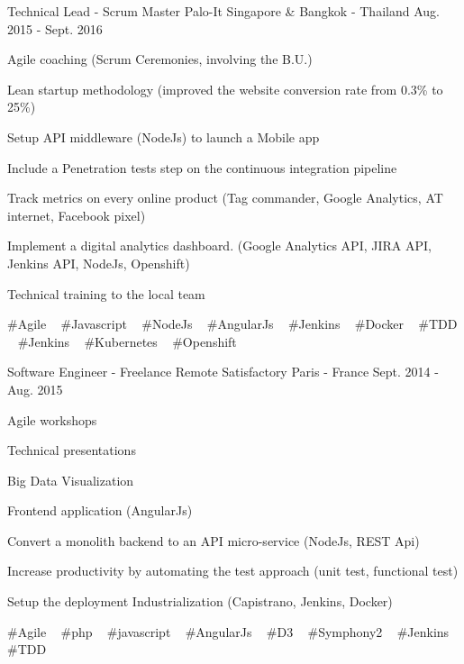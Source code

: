 \begin{cventries}
  \cventry
    {Technical Lead - Scrum Master} %
    {Palo-It} %
    {Singapore \& Bangkok - Thailand} %
    {Aug. 2015 - Sept. 2016} %
    {
      \begin{cvitems} %
        \item {Agile coaching (Scrum Ceremonies, involving the B.U.)}
        \item {Lean startup methodology (improved the website conversion rate from 0.3\% to 25\%) }
        \item {Setup API middleware (NodeJs) to launch a Mobile app}
        \item {Include a Penetration tests step on the continuous integration pipeline}
        \item {Track metrics on every online product (Tag commander, Google Analytics, AT internet, Facebook pixel)}
        \item {Implement a digital analytics dashboard. (Google Analytics API, JIRA API, Jenkins API, NodeJs, Openshift)}
        \item {Technical training to the local team}
      \end{cvitems}
    }
    {
      \#Agile ~
      \#Javascript ~
      \#NodeJs ~
      \#AngularJs ~
      \#Jenkins ~
      \#Docker ~
      \#TDD ~
      \#Jenkins ~
      \#Kubernetes ~
      \#Openshift
    }

  \cventry
    {Software Engineer - Freelance Remote} %
    {Satisfactory} %
    {Paris - France} %
    {Sept. 2014 - Aug. 2015} %
    {
      \begin{cvitems} %
        \item {Agile workshops}
        \item {Technical presentations}
        \item {Big Data Visualization}
        \item {Frontend application (AngularJs)}
        \item {Convert a monolith backend to an API micro-service (NodeJs, REST Api)}
        \item {Increase productivity by automating the test approach (unit test, functional test)}
        \item {Setup the deployment Industrialization (Capistrano, Jenkins, Docker)}
      \end{cvitems}
    }
    {
      \#Agile ~
      \#php ~
      \#javascript ~
      \#AngularJs ~
      \#D3 ~
      \#Symphony2 ~
      \#Jenkins ~
      \#TDD 
    }


\end{cventries}
